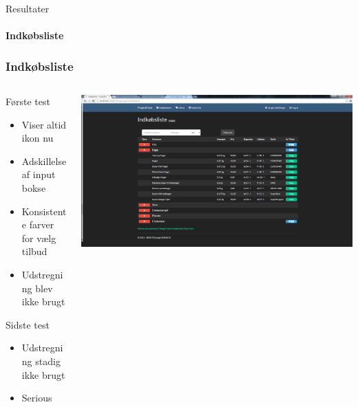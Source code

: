 \begin{frame}{Resultater}
\framesubtitle{Indkøbsliste}
	\subsubsection{Indkøbsliste}
	
	\begin{minipage}[0.3\textheight]{\textwidth}
	\begin{columns}[T]
	\begin{column}{0.5\textwidth}
	 
	 Første test
	 \begin{itemize}
	 	\item Viser altid ikon nu
	 	\item Adskillelse af input bokse
	 	\item Konsistente farver for vælg tilbud
	 	\item Udstregning blev ikke brugt
	 \end{itemize}
	 Sidste test
	 \begin{itemize}
	 	\item Udstregning stadig ikke brugt
	 	\item Serious
	 \end{itemize}
	 
	\end{column}
	\begin{column}{0.5\textwidth}
	 \includegraphics[width=1\textwidth,height=1\textheight,keepaspectratio, trim={1cm 0 0 16mm}, clip]{images/Screenshots/ShoppingListOffersOld.png}
	 
	 \vspace{2 mm}
	  

\end{column}
\end{columns}
\end{minipage}
\end{frame}
